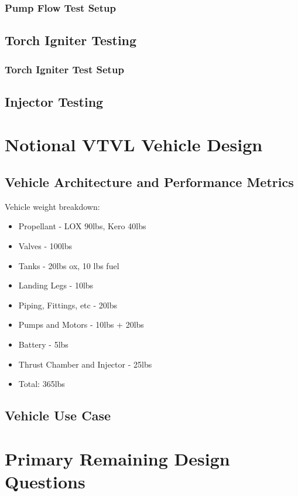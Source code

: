 \documentclass[12pt, letterpaper]{article}
\begin{document}
\subsubsection{Pump Flow Test Setup}
\subsection{Torch Igniter Testing}
\subsubsection{Torch Igniter Test Setup}
\subsection{Injector Testing}

\newpage

\section{Notional VTVL Vehicle Design}
\subsection{Vehicle Architecture and Performance Metrics}

Vehicle weight breakdown:\par
\begin{itemize}
    \item Propellant - LOX 90lbs, Kero 40lbs
    \item Valves - 100lbs
    \item Tanks - 20lbs ox, 10 lbs fuel
    \item Landing Legs - 10lbs
    \item Piping, Fittings, etc - 20lbs
    \item Pumps and Motors - 10lbs + 20lbs
    \item Battery - 5lbs
    \item Thrust Chamber and Injector - 25lbs
    \item Total: 365lbs
\end{itemize}

\subsection{Vehicle Use Case}

\section{Primary Remaining Design Questions}
\end{document}
